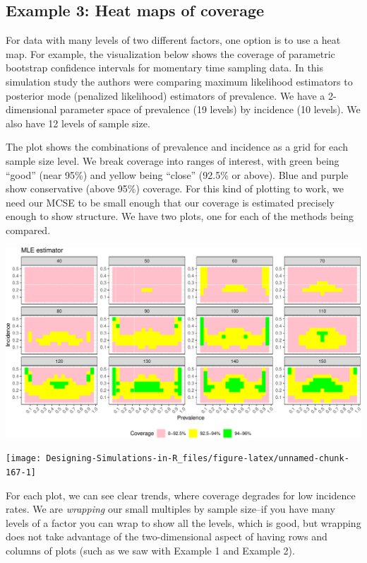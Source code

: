 \documentclass[
]{book}
\begin{document}
\subsection{Example 3: Heat maps of coverage}\label{example-3-heat-maps-of-coverage}

For data with many levels of two different factors, one option is to use a heat map.
For example, the visualization below shows the coverage of parametric bootstrap confidence intervals for momentary time sampling data.
In this simulation study the authors were comparing maximum likelihood estimators to posterior mode (penalized likelihood) estimators of prevalence.
We have a 2-dimensional parameter space of prevalence (19 levels) by incidence (10 levels).
We also have 12 levels of sample size.

The plot shows the combinations of prevalence and incidence as a grid for each sample size level.
We break coverage into ranges of interest, with green being ``good'' (near 95\%) and yellow being ``close'' (92.5\% or above).
Blue and purple show conservative (above 95\%) coverage.
For this kind of plotting to work, we need our MCSE to be small enough that our coverage is estimated precisely enough to show structure.
We have two plots, one for each of the methods being compared.

\begin{center}\includegraphics[width=0.75\linewidth]{Designing-Simulations-in-R_files/figure-latex/swan_example_setup-1} \end{center}

\begin{center}\texttt{[image: Designing-Simulations-in-R\_files/figure-latex/unnamed-chunk-167-1]} \end{center}

For each plot, we can see clear trends, where coverage degrades for low incidence rates.
We are \emph{wrapping} our small multiples by sample size--if you have many levels of a factor you can wrap to show all the levels, which is good, but wrapping does not take advantage of the two-dimensional aspect of having rows and columns of plots (such as we saw with Example 1 and Example 2).
\end{document}
